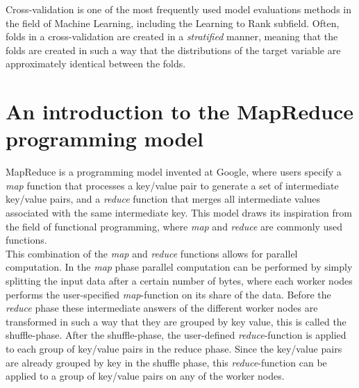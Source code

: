 Cross-validation is one of the most frequently used model evaluations methods in the field of Machine Learning, including the Learning to Rank subfield. Often, folds in a cross-validation are created in a \emph{stratified} manner, meaning that the folds are created in such a way that the distributions of the target variable are approximately identical between the folds.

\section{An introduction to the MapReduce programming model}
MapReduce \cite{Dean2004} is a programming model invented at Google, where users specify a \emph{map} function that processes a key/value pair to generate a set of intermediate key/value pairs, and a \emph{reduce} function that merges all intermediate values associated with the same intermediate key. This model draws its inspiration from the field of functional programming, where \emph{map} and \emph{reduce} are commonly used functions.\\

This combination of the \emph{map} and \emph{reduce} functions allows for parallel computation. In the \emph{map} phase parallel computation can be performed by simply splitting the input data after a certain number of bytes, where each worker nodes performs the user-specified \emph{map}-function on its share of the data. Before the \emph{reduce} phase these intermediate answers of the different worker nodes are transformed in such a way that they are grouped by key value, this is called the shuffle-phase. After the shuffle-phase, the user-defined \emph{reduce}-function is applied to each group of key/value pairs in the reduce phase. Since the key/value pairs are already grouped by key in the shuffle phase, this \emph{reduce}-function can be applied to a group of key/value pairs on any of the worker nodes.\\